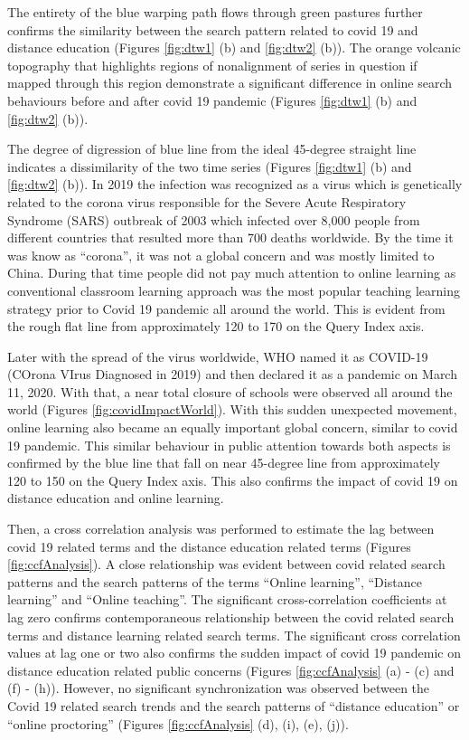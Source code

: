 \documentclass[11pt,a4paper,]{article}
\begin{document}
The entirety of the blue warping path flows through green pastures further confirms the similarity between the search pattern related to covid 19 and distance education (Figures \ref{fig:dtw1} (b) and \ref{fig:dtw2} (b)). The orange volcanic topography that highlights regions of nonalignment of series in question if mapped through this region demonstrate a significant difference in online search behaviours before and after covid 19 pandemic (Figures \ref{fig:dtw1} (b) and \ref{fig:dtw2} (b)).

The degree of digression of blue line from the ideal 45-degree straight line indicates a dissimilarity of the two time
series (Figures \ref{fig:dtw1} (b) and \ref{fig:dtw2} (b)). In 2019 the infection was recognized as a virus which is genetically related to the corona virus responsible for the Severe Acute Respiratory Syndrome (SARS) outbreak of 2003 which infected over 8,000 people from different countries that resulted more than 700 deaths worldwide. By the time it was know as ``corona'', it was not a global concern and was mostly limited to China. During that time people did not pay much attention to online learning as conventional classroom learning approach was the most popular teaching learning strategy prior to Covid 19 pandemic all around the world. This is evident from the rough flat line from approximately 120 to 170 on the Query Index axis.

Later with the spread of the virus worldwide, WHO named it as COVID-19 (COrona VIrus Diagnosed in 2019) and then declared it as a pandemic on March 11, 2020. With that, a near total closure of schools were observed all around the world (Figures \ref{fig:covidImpactWorld}). With this sudden unexpected movement, online learning also became an equally important global concern, similar to covid 19 pandemic. This similar behaviour in public attention towards both aspects is confirmed by the blue line that fall on near 45-degree line from approximately 120 to 150 on the Query Index axis. This also confirms the impact of covid 19 on distance education and online learning.

Then, a cross correlation analysis was performed to estimate the lag between covid 19 related terms and the distance education related terms (Figures \ref{fig:ccfAnalysis}). A close relationship was evident between covid related search patterns and the search patterns of the terms ``Online learning'', ``Distance learning'' and ``Online teaching''. The significant cross-correlation coefficients at lag zero confirms contemporaneous relationship between the covid related search terms and distance learning related search terms. The significant cross correlation values at lag one or two also confirms the sudden impact of covid 19 pandemic on distance education related public concerns (Figures \ref{fig:ccfAnalysis} (a) - (c) and (f) - (h)). However, no significant synchronization was observed between the Covid 19 related search trends and the search patterns of ``distance education'' or ``online proctoring'' (Figures \ref{fig:ccfAnalysis} (d), (i), (e), (j)).
\end{document}

